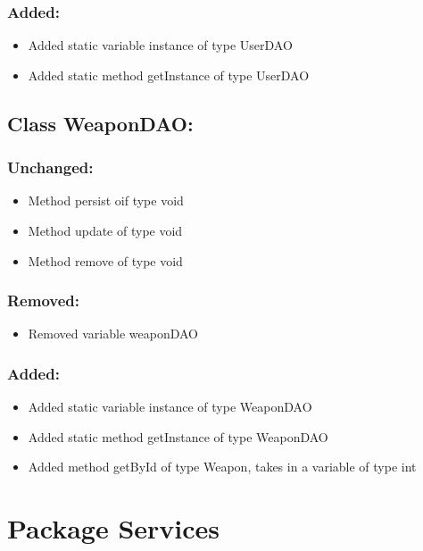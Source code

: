 \documentclass{article}
\begin{document}
\subsubsection{Added:}
\begin{itemize}
\item Added static variable instance of type UserDAO
\item Added static method getInstance of type UserDAO
\end{itemize}


\subsection{Class WeaponDAO:}

\subsubsection{Unchanged:}
\begin{itemize}
\item Method persist oif type void
\item Method update of type void
\item Method remove of type void
\end{itemize}

\subsubsection{Removed:}
\begin{itemize}
\item Removed variable weaponDAO
\end{itemize}

\subsubsection{Added:}
\begin{itemize}
\item Added static variable instance of type WeaponDAO
\item Added static method getInstance of type WeaponDAO
\item Added method getById of type Weapon, takes in a variable of type int
\end{itemize}


\section{Package Services}
\end{document}
